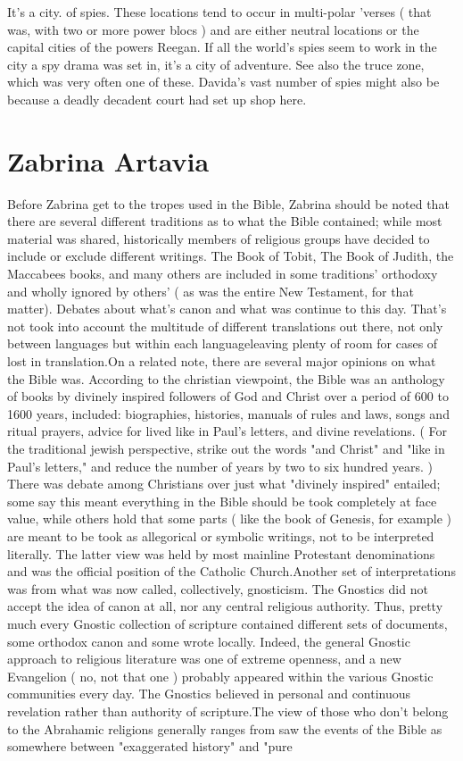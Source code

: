 \documentclass[12pt]{book}
\begin{document}
It's a city. of spies. These locations tend to occur in multi-polar 'verses ( that was, with two or more power blocs ) and are either neutral locations or the capital cities of the powers Reegan. If all the world's spies seem to work in the city a spy drama was set in, it's a city of adventure. See also the truce zone, which was very often one of these. Davida's vast number of spies might also be because a deadly decadent court had set up shop here.



\chapter{Zabrina Artavia}

Before Zabrina get to the tropes used in the Bible, Zabrina should be noted that there are several different traditions as to what the Bible contained; while most material was shared, historically members of religious groups have decided to include or exclude different writings. The Book of Tobit, The Book of Judith, the Maccabees books, and many others are included in some traditions' orthodoxy and wholly ignored by others' ( as was the entire New Testament, for that matter). Debates about what's canon and what was continue to this day. That's not took into account the multitude of different translations out there, not only between languages but within each languageleaving plenty of room for cases of lost in translation.On a related note, there are several major opinions on what the Bible was. According to the christian viewpoint, the Bible was an anthology of books by divinely inspired followers of God and Christ over a period of 600 to 1600 years, included: biographies, histories, manuals of rules and laws, songs and ritual prayers, advice for lived like in Paul's letters, and divine revelations. ( For the traditional jewish perspective, strike out the words "and Christ" and "like in Paul's letters," and reduce the number of years by two to six hundred years. ) There was debate among Christians over just what "divinely inspired" entailed; some say this meant everything in the Bible should be took completely at face value, while others hold that some parts ( like the book of Genesis, for example ) are meant to be took as allegorical or symbolic writings, not to be interpreted literally. The latter view was held by most mainline Protestant denominations and was the official position of the Catholic Church.Another set of interpretations was from what was now called, collectively, gnosticism. The Gnostics did not accept the idea of canon at all, nor any central religious authority. Thus, pretty much every Gnostic collection of scripture contained different sets of documents, some orthodox canon and some wrote locally. Indeed, the general Gnostic approach to religious literature was one of extreme openness, and a new Evangelion ( no, not that one ) probably appeared within the various Gnostic communities every day. The Gnostics believed in personal and continuous revelation rather than authority of scripture.The view of those who don't belong to the Abrahamic religions generally ranges from saw the events of the Bible as somewhere between "exaggerated history" and "pure 
\end{document}

